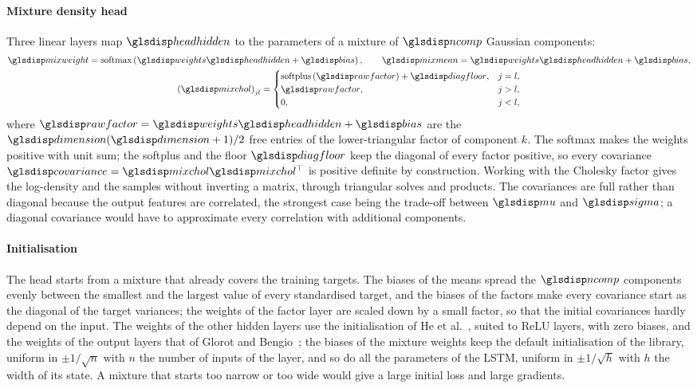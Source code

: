 \documentclass[12pt]{report}
\begin{document}
\paragraph{Mixture density head}
Three linear layers map $\sym{headhidden}_i$ to the parameters of a mixture of $\sym{ncomp}$ Gaussian components:
\begin{equation}
    \begin{gathered}
        \sym{mixweight}_i=\operatorname{softmax}\left(\sym{weights}_\pi \sym{headhidden}_i+\sym{bias}_\pi\right),\qquad
        \sym{mixmean}_{i,k}=\sym{weights}_{m,k}\sym{headhidden}_i+\sym{bias}_{m,k},\\
        \left(\sym{mixchol}_{i,k}\right)_{jl}=
        \begin{cases}
            \operatorname{softplus}\left(\sym{rawfactor}_{i,k,jj}\right)+\sym{diagfloor}, & j=l,\\
            \sym{rawfactor}_{i,k,jl}, & j>l,\\
            0, & j<l,
        \end{cases}
    \end{gathered}
    \label{eq:mdn_head}
\end{equation}
where $\sym{rawfactor}_{i,k}=\sym{weights}_{C,k}\sym{headhidden}_i+\sym{bias}_{C,k}$ are the $\sym{dimension}(\sym{dimension}+1)/2$ free entries of the lower-triangular factor of component $k$. The softmax makes the weights positive with unit sum; the softplus and the floor $\sym{diagfloor}$ keep the diagonal of every factor positive, so every covariance $\sym{covariance}_{i,k}=\sym{mixchol}_{i,k}\sym{mixchol}_{i,k}^\top$ is positive definite by construction. Working with the Cholesky factor gives the log-density and the samples without inverting a matrix, through triangular solves and products. The covariances are full rather than diagonal because the output features are correlated, the strongest case being the trade-off between $\sym{mu}$ and $\sym{sigma}$; a diagonal covariance would have to approximate every correlation with additional components.

\paragraph{Initialisation}
The head starts from a mixture that already covers the training targets. The biases of the means spread the $\sym{ncomp}$ components evenly between the smallest and the largest value of every standardised target, and the biases of the factors make every covariance start as the diagonal of the target variances; the weights of the factor layer are scaled down by a small factor, so that the initial covariances hardly depend on the input. The weights of the other hidden layers use the initialisation of He et al.~\cite{he2015delving}, suited to ReLU layers, with zero biases, and the weights of the output layers that of Glorot and Bengio~\cite{glorot2010understanding}; the biases of the mixture weights keep the default initialisation of the library, uniform in $\pm1/\sqrt{n}$ with $n$ the number of inputs of the layer, and so do all the parameters of the LSTM, uniform in $\pm1/\sqrt{h}$ with $h$ the width of its state. A mixture that starts too narrow or too wide would give a large initial loss and large gradients.
\end{document}
